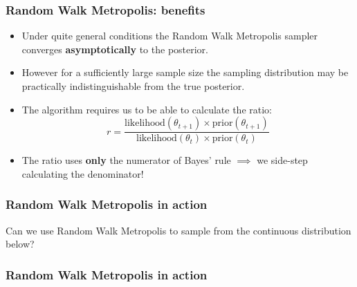 \documentclass[handout]{beamer}
\begin{document}
\begin{frame}
\frametitle{Random Walk Metropolis: benefits}

\begin{itemize}
\item<2-> Under quite general conditions the Random Walk Metropolis sampler converges \textbf{asymptotically} to the posterior.
\item<3-> However for a sufficiently large sample size the sampling distribution may be practically indistinguishable from the true posterior.
\item<4-> The algorithm requires us to be able to calculate the ratio:
\begin{equation}
r = \frac{\text{likelihood}(\theta_{t+1})\times\text{prior}(\theta_{t+1})}{\text{likelihood}(\theta_{t})\times\text{prior}(\theta_{t})}
\end{equation}
\item<6-> The ratio uses \textbf{only} the numerator of Bayes' rule $\implies$ we side-step calculating the denominator!
\end{itemize}

\end{frame}

\begin{frame}
\frametitle{Random Walk Metropolis in action}
Can we use Random Walk Metropolis to sample from the continuous distribution below?
\end{frame}

\begin{frame}
\frametitle{Random Walk Metropolis in action}
\begin{figure}[t]
\centerline{}
\end{figure}

\end{frame}
\end{document}
